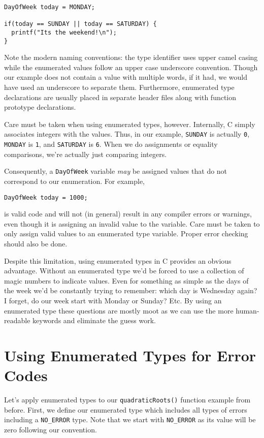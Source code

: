 \begin{verbatim}
DayOfWeek today = MONDAY;

if(today == SUNDAY || today == SATURDAY) {
  printf("Its the weekend!\n");
}
\end{verbatim}

Note the modern naming conventions: the type identifier uses 
upper camel casing while the enumerated values follow an 
upper case underscore convention.  Though our example does
not contain a value with multiple words, if it had, we would have
used an underscore to separate them.  Furthermore, enumerated
type declarations are usually placed in separate header files
along with function prototype declarations.  

Care must be taken when using enumerated types, however.  
Internally, C simply associates integers with the values.  Thus, 
in our example, \texttt{SUNDAY} is actually \texttt{0}, 
\texttt{MONDAY} is \texttt{1}, and 
\texttt{SATURDAY} is \texttt{6}.  When we do
assignments or equality comparisons, we're actually just
comparing integers.  

Consequently, a \texttt{DayOfWeek} variable \emph{may}
be assigned values that do not correspond to our enumeration. 
For example, 

\texttt{DayOfWeek today = 1000;}

is valid code and will not (in general) result in any compiler errors
or warnings, even though it is assigning an invalid value to the 
variable.  Care must be taken to only assign valid values to an
enumerated type variable.  Proper error checking should also
be done.

Despite this limitation, using enumerated types in C provides an
obvious advantage.  Without an enumerated type we'd be forced
to use a collection of \glspl{magic number} to indicate values.  
Even for something as simple as the days of the week we'd be
constantly trying to remember: which day is Wednesday again?
I forget, do our week start with Monday or Sunday?  Etc.  By
using an enumerated type these questions are mostly moot as
we can use the more human-readable keywords and eliminate
the guess work.

\section{Using Enumerated Types for Error Codes}

Let's apply enumerated types to our \texttt{quadraticRoots()}
function example from before.  First, we define our enumerated
type which includes all types of errors including a \texttt{NO_ERROR}
type.  Note that we start with \texttt{NO_ERROR} as its value
will be zero following our convention.

